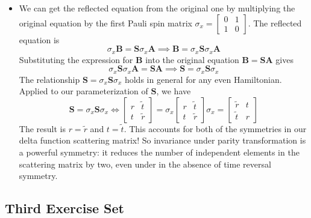 \documentclass[11pt, a4paper]{article}
\renewcommand{\vec}[1]{\bm{#1}} %
\newcommand{\mat}[1]{\mathbf{#1}} %
\begin{document}
\begin{itemize}
	\item We can get the reflected equation from the original one by multiplying the original equation by the first Pauli spin matrix $ \sigma_{x} = 
	\begin{bmatrix}
		0 & 1\\
		1 & 0
	\end{bmatrix}$. The reflected equation is
	\begin{equation*}
		\sigma_{x}\vec{B} = \mat{S} \sigma_{x}\vec{A} \implies \vec{B} = \sigma_{x} \mat{S} \sigma_{x}\vec{A}
	\end{equation*}
	Substituting the expression for $ \vec{B} $ into the original equation $ \vec{B} = \mat{S} \vec{A} $ gives
	\begin{equation*}
		\sigma_{x} \mat{S} \sigma_{x}\vec{A} = \mat{S} \vec{A} \implies \mat{S} = \sigma_{x} \mat{S} \sigma_{x}
	\end{equation*}
	The relationship $ \mat{S} = \sigma_{x} \mat{S} \sigma_{x} $ holds in general for any even Hamiltonian. Applied to our parameterization of $ \mat{S} $, we have
	\begin{equation*}
		\mat{S} = \sigma_{x} \mat{S} \sigma_{x} \iff
		\begin{bmatrix}
			r & \tilde{t}\\
			t & \tilde{r}
		\end{bmatrix}
		= \sigma_{x}
		\begin{bmatrix}
			r & \tilde{t}\\
			t & \tilde{r}
		\end{bmatrix}
		\sigma_{x}
		=
		\begin{bmatrix}
			\tilde{r} & t\\
			\tilde{t} & r
		\end{bmatrix}
	\end{equation*}
	The result is $ r = \tilde{r} $ and $ t = \tilde{t} $. This accounts for both of the symmetries in our delta function scattering matrix! So invariance under parity transformation is a powerful symmetry: it reduces the number of independent elements in the scattering matrix by two, even under in the absence of time reversal symmetry.
	
	
\end{itemize}

\subsection{Third Exercise Set} 
\end{document}

